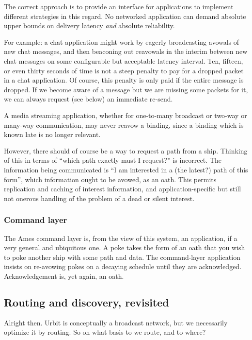 The correct approach is to provide an interface for applications to
implement different strategies in this regard. No networked application
can demand absolute upper bounds on delivery latency \emph{and} absolute
reliability.

For example: a chat application might work by eagerly broadcasting
avowals of new chat messages, and then beaconing out reavowals in the
interim between new chat messages on some configurable but acceptable
latency interval. Ten, fifteen, or even thirty seconds of time is not a
steep penalty to pay for a dropped packet in a chat application. Of
course, this penalty is only paid if the entire message is dropped. If
we become aware of a message but we are missing some packets for it, we
can always request (see below) an immediate re-send.

A media streaming application, whether for one-to-many broadcast or
two-way or many-way communication, may never reavow a binding, since a
binding which is known late is no longer relevant.

However, there should of course be a way to request a path from a ship.
Thinking of this in terms of ``which path exactly must I request?'' is
incorrect. The information being communicated is ``I am interested in a
(the latest?) path of this form'', which information ought to be avowed,
as an oath. This permits replication and caching of interest
information, and application-specific but still not onerous handling of
the problem of a dead or silent interest.

\subsubsection{Command layer}

The Ames command layer is, from the view of this system, an application,
if a very general and ubiquitous one. A poke takes the form of an oath
that you wish to poke another ship with some path and data. The
command-layer application insists on re-avowing pokes on a decaying
schedule until they are acknowledged. Acknowledgement is, yet again, an
oath.

\subsection{Routing and discovery, revisited}

Alright then. Urbit is conceptually a broadcast network, but we
necessarily optimize it by routing. So on what basis to we route, and to
where?


